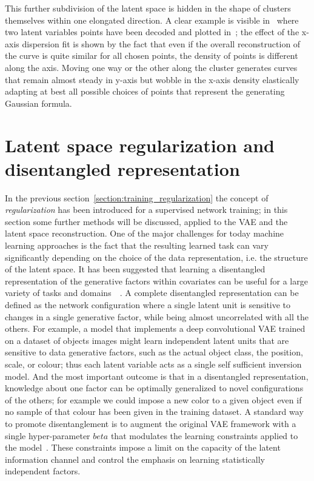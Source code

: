 This further subdivision of the latent space is hidden in the shape of clusters themselves within one elongated direction. A clear example is visible in~\Figure{\ref{fig:step1_elastic}} where two latent variables points have been decoded and plotted in~\Figure{\ref{fig:step1_elastic_gn1}\ref{fig:step1_elastic_gn2}}; the effect of the x-axis dispersion fit is shown by the fact that even if the overall reconstruction of the curve is quite similar for all chosen points, the density of points is different along the axis. Moving one way or the other along the cluster generates curves that remain almost steady in y-axis but wobble in the x-axis density elastically adapting at best all possible choices of points that represent the generating Gaussian formula.

\section{Latent space regularization and disentangled representation}
In the previous section~\cref{section:training_regularization} the concept of \textit{regularization} has been introduced for a supervised network training; in this section some further methods will be discussed, applied to the \acs{VAE} and the latent space reconstruction.
%
One of the major challenges for today machine learning approaches is the fact that the resulting learned task can vary significantly depending on the choice of the data representation, i.e. the structure of the latent space.
It has been suggested that learning a disentangled representation of the generative factors within covariates can be useful for a large variety of tasks and domains~\cite{Bengio_2013}~\cite{ridgeway2016survey}. A complete disentangled representation can be defined as the network configuration where a single latent unit is sensitive to changes in a single generative factor, while being almost uncorrelated with all the others.
For example, a model that implements a deep convolutional \acs{VAE} trained on a dataset of objects images might learn independent latent units that are sensitive to data generative factors, such as the actual object class, the position, scale, or colour; thus each latent variable acts as a single self sufficient inversion model. And the most important outcome is that in a disentangled representation, knowledge about one factor can be optimally generalized to novel configurations of the others; for example we could impose a new color to a given object even if no sample of that colour has been given in the training dataset.
%
A standard way to promote disentanglement is to augment the original \acs{VAE} framework with a single hyper-parameter $beta$ that modulates the learning constraints applied to the model~\cite{Higgins2017betaVAELB}. These constraints impose a limit on the capacity of the latent information channel and control the emphasis on learning statistically independent factors. 
